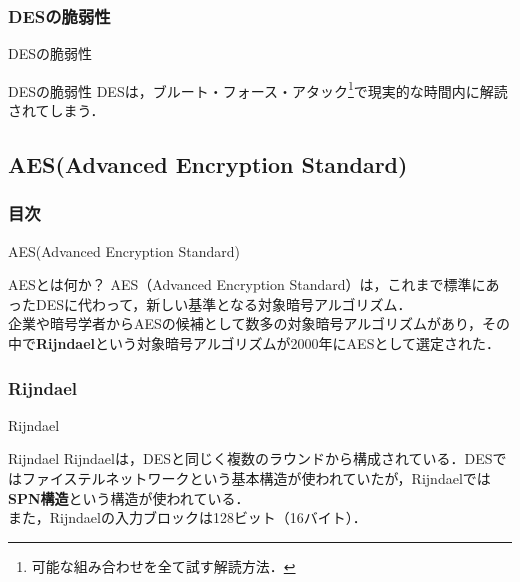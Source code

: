 \documentclass[dvipdfmx]{beamer}
\begin{document}
\subsubsection{DESの脆弱性}
\begin{frame}{DESの脆弱性}
    \begin{alertblock}{DESの脆弱性}
        DESは，ブルート・フォース・アタック\footnote{可能な組み合わせを全て試す解読方法．}で現実的な時間内に解読されてしまう．\\
    \end{alertblock}
\end{frame}
\subsection{AES(Advanced Encryption Standard)}
\begin{frame}
\frametitle{目次}
\tableofcontents[currentsection,sectionstyle=show/shaded,subsectionstyle=show/shaded]
\end{frame}
\begin{frame}{AES(Advanced Encryption Standard)}
    \begin{block}{AESとは何か？}
        AES（Advanced Encryption Standard）は，これまで標準にあったDESに代わって，新しい基準となる対象暗号アルゴリズム．\\
        企業や暗号学者からAESの候補として数多の対象暗号アルゴリズムがあり，その中で\textbf{Rijndael}という対象暗号アルゴリズムが2000年にAESとして選定された．
    \end{block}
\end{frame}
\subsubsection{Rijndael}
\begin{frame}{Rijndael}
    \begin{block}{Rijndael}
        Rijndaelは，DESと同じく複数のラウンドから構成されている．DESではファイステルネットワークという基本構造が使われていたが，Rijndaelでは\textbf{SPN構造}という構造が使われている．\\
        また，Rijndaelの入力ブロックは128ビット（16バイト）．
    \end{block}
\end{frame}
\end{document}
